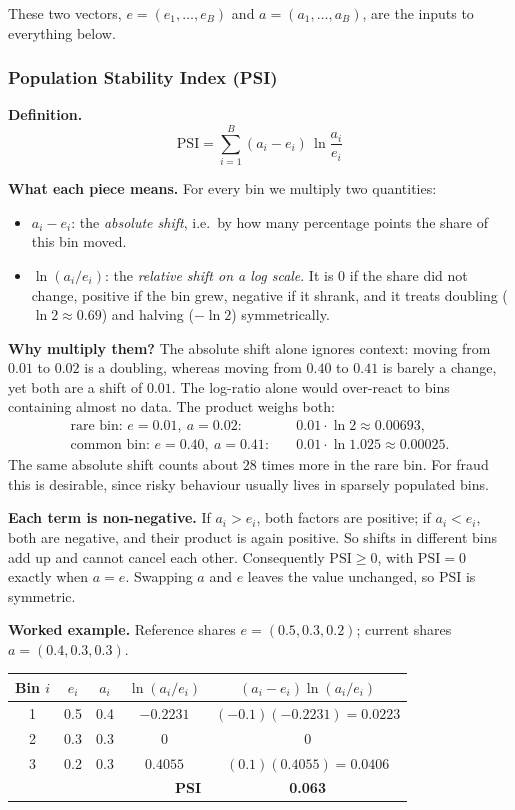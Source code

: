 \documentclass[11pt]{article}
\begin{document}
These two vectors, \(e=(e_1,\dots,e_B)\) and \(a=(a_1,\dots,a_B)\), are the inputs to everything below.

\subsubsection{Population Stability Index (PSI)}

\textbf{Definition.}
\[
\boxed{
\mathrm{PSI}=\sum_{i=1}^{B}(a_i-e_i)\,\ln\frac{a_i}{e_i}
}
\]

\textbf{What each piece means.} For every bin we multiply two quantities:
\begin{itemize}
    \item \(a_i-e_i\): the \emph{absolute shift}, i.e.\ by how many percentage points the share of this bin moved.
    \item \(\ln(a_i/e_i)\): the \emph{relative shift on a log scale}. It is \(0\) if the share did not change, positive if the bin grew, negative if it shrank, and it treats doubling (\(\ln2\approx0.69\)) and halving (\(-\ln2\)) symmetrically.
\end{itemize}

\textbf{Why multiply them?} The absolute shift alone ignores context: moving from \(0.01\) to \(0.02\) is a doubling, whereas moving from \(0.40\) to \(0.41\) is barely a change, yet both are a shift of \(0.01\). The log-ratio alone would over-react to bins containing almost no data. The product weighs both:
\[
\begin{aligned}
\text{rare bin: } e=0.01,\ a=0.02:&\quad 0.01\cdot\ln 2\approx 0.00693,\\
\text{common bin: } e=0.40,\ a=0.41:&\quad 0.01\cdot\ln 1.025\approx 0.00025.
\end{aligned}
\]
The same absolute shift counts about \(28\) times more in the rare bin. For fraud this is desirable, since risky behaviour usually lives in sparsely populated bins.

\textbf{Each term is non-negative.} If \(a_i>e_i\), both factors are positive; if \(a_i<e_i\), both are negative, and their product is again positive. So shifts in different bins add up and cannot cancel each other. Consequently \(\mathrm{PSI}\ge 0\), with \(\mathrm{PSI}=0\) exactly when \(a=e\). Swapping \(a\) and \(e\) leaves the value unchanged, so PSI is symmetric.

\textbf{Worked example.} Reference shares \(e=(0.5,0.3,0.2)\); current shares \(a=(0.4,0.3,0.3)\).

\begin{center}
\begin{tabular}{|c|c|c|c|c|}
\hline
Bin \(i\) & \(e_i\) & \(a_i\) & \(\ln(a_i/e_i)\) & \((a_i-e_i)\ln(a_i/e_i)\) \\
\hline
1 & 0.5 & 0.4 & \(-0.2231\) & \((-0.1)(-0.2231)=0.0223\) \\
2 & 0.3 & 0.3 & \(0\) & \(0\) \\
3 & 0.2 & 0.3 & \(0.4055\) & \((0.1)(0.4055)=0.0406\) \\
\hline
\multicolumn{4}{|r|}{\textbf{PSI}} & \textbf{0.063} \\
\hline
\end{tabular}
\end{center}
\end{document}
